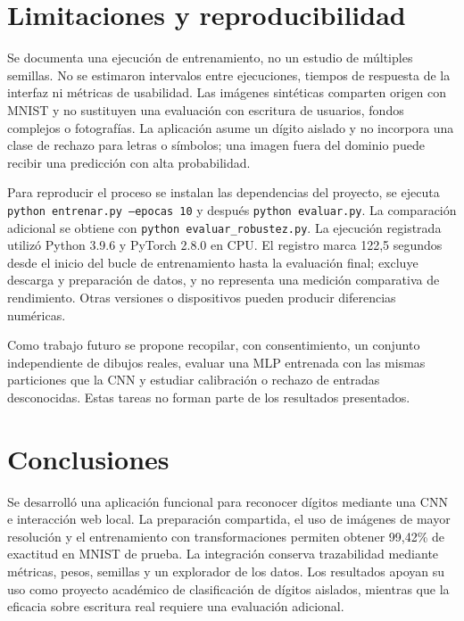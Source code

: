 \documentclass[conference]{IEEEtran}
\begin{document}
\section{Limitaciones y reproducibilidad}
Se documenta una ejecución de entrenamiento, no un estudio de múltiples semillas. No se estimaron intervalos entre ejecuciones, tiempos de respuesta de la interfaz ni métricas de usabilidad. Las imágenes sintéticas comparten origen con MNIST y no sustituyen una evaluación con escritura de usuarios, fondos complejos o fotografías. La aplicación asume un dígito aislado y no incorpora una clase de rechazo para letras o símbolos; una imagen fuera del dominio puede recibir una predicción con alta probabilidad.

Para reproducir el proceso se instalan las dependencias del proyecto, se ejecuta \texttt{python entrenar.py --epocas 10} y después \texttt{python evaluar.py}. La comparación adicional se obtiene con \texttt{python evaluar\_robustez.py}. La ejecución registrada utilizó Python 3.9.6 y PyTorch 2.8.0 en CPU. El registro marca 122,5 segundos desde el inicio del bucle de entrenamiento hasta la evaluación final; excluye descarga y preparación de datos, y no representa una medición comparativa de rendimiento. Otras versiones o dispositivos pueden producir diferencias numéricas.

Como trabajo futuro se propone recopilar, con consentimiento, un conjunto independiente de dibujos reales, evaluar una MLP entrenada con las mismas particiones que la CNN y estudiar calibración o rechazo de entradas desconocidas. Estas tareas no forman parte de los resultados presentados.

\section{Conclusiones}
Se desarrolló una aplicación funcional para reconocer dígitos mediante una CNN e interacción web local. La preparación compartida, el uso de imágenes de mayor resolución y el entrenamiento con transformaciones permiten obtener 99,42\% de exactitud en MNIST de prueba. La integración conserva trazabilidad mediante métricas, pesos, semillas y un explorador de los datos. Los resultados apoyan su uso como proyecto académico de clasificación de dígitos aislados, mientras que la eficacia sobre escritura real requiere una evaluación adicional.



\end{document}
